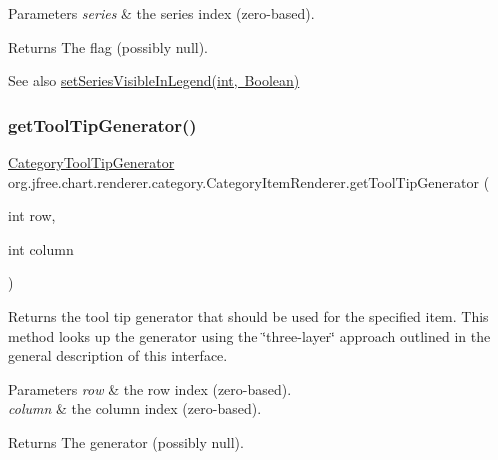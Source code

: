 \begin{DoxyParams}{Parameters}
{\em series} & the series index (zero-\/based).\\
\hline
\end{DoxyParams}
\begin{DoxyReturn}{Returns}
The flag (possibly {\ttfamily null}).
\end{DoxyReturn}
\begin{DoxySeeAlso}{See also}
\mbox{\hyperlink{interfaceorg_1_1jfree_1_1chart_1_1renderer_1_1category_1_1_category_item_renderer_a49a49aaa13e05a123ae9808c3f0cb5c8}{set\+Series\+Visible\+In\+Legend(int, Boolean)}} 
\end{DoxySeeAlso}
\mbox{\label{interfaceorg_1_1jfree_1_1chart_1_1renderer_1_1category_1_1_category_item_renderer_aaadd626509dd8276e4704cb1d88a74ea}} 
\subsubsection{\texorpdfstring{get\+Tool\+Tip\+Generator()}{getToolTipGenerator()}\hspace{0.1cm}{\footnotesize\ttfamily [1/2]}}
{\footnotesize\ttfamily \mbox{\hyperlink{interfaceorg_1_1jfree_1_1chart_1_1labels_1_1_category_tool_tip_generator}{Category\+Tool\+Tip\+Generator}} org.\+jfree.\+chart.\+renderer.\+category.\+Category\+Item\+Renderer.\+get\+Tool\+Tip\+Generator (\begin{DoxyParamCaption}\item[{int}]{row,  }\item[{int}]{column }\end{DoxyParamCaption})}

Returns the tool tip generator that should be used for the specified item. This method looks up the generator using the \char`\"{}three-\/layer\char`\"{} approach outlined in the general description of this interface.


\begin{DoxyParams}{Parameters}
{\em row} & the row index (zero-\/based). \\
\hline
{\em column} & the column index (zero-\/based).\\
\hline
\end{DoxyParams}
\begin{DoxyReturn}{Returns}
The generator (possibly {\ttfamily null}). 
\end{DoxyReturn}


